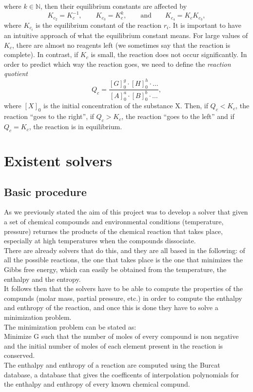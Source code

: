 \documentclass[a4paper,10pt]{article}
\newcommand{\mN}{{\mathbb N}}
\theoremstyle{plain}
\theoremstyle{definition}
\theoremstyle{remark}
\newcommand{\quotes}[1]{``#1''}
\begin{document}
where $k\in\mN$, then their equilibrium constants are affected by
\begin{equation}
K_{c_{2}} = K_c^{-1}, \qquad K_{c_{3}} = K_c^k, \qquad \text{and} \qquad K_{c_{4}} = K_c K_{c_{3}},
\end{equation}
where $K_{c_i}$ is the equilibrium constant of the reaction $r_i$.
It is important to have an intuitive approach of what the equilibrium constant means. For large values of $K_c$, there are almost no reagents left (we sometimes say that the reaction is complete). In contrast, if $K_c$ is small, the reaction does not occur significantly. In order to predict which way the reaction goes, we need to define the \textit{reaction quotient}
\begin{equation}
Q_c= \frac{[G]_0^g\cdot [H]_0^h\cdot\dots}{[A]_0^a\cdot [B]_0^b\cdot\dots},
\end{equation}
where $[X]_0$ is the initial concentration of the substance X. Then, if $Q_c<K_c$, the reaction \quotes{goes to the right}, if $Q_c>K_c$, the reaction \quotes{goes to the left} and if $Q_c=K_c$, the reaction is in equilibrium.

\section{Existent solvers}
\subsection{Basic procedure}
As we previously stated the aim of this project was to develop a solver that given a set of chemical compounds and environmental conditions (temperature, pressure) returnes the products of the chemical reaction that takes place, especially at high temperatures when the compounds dissociate.\\
There are already solvers that do this, and they are all based in the following: of all the possible reactions, the one that takes place is the one that minimizes the Gibbs free energy, which can easily be obtained from the temperature, the enthalpy and the entropy.\\
It follows then that the solvers have to be able to compute the properties of the compunds (molar mass, partial pressure, etc.) in order to compute the enthalpy and enthropy of the reaction, and once this is done they have to solve a minimization problem.\\
The minimization problem can be stated as:\\
Minimize G such that the number of moles of every compound is non negative and the initial number of moles of each element present in the reaction is conserved.\\
The enthalpy and enthropy of a reaction are computed using the Burcat database, a database that gives the coefficents of interpolation polynomials for the enthalpy and enthropy of every known chemical compund. 
\end{document}
